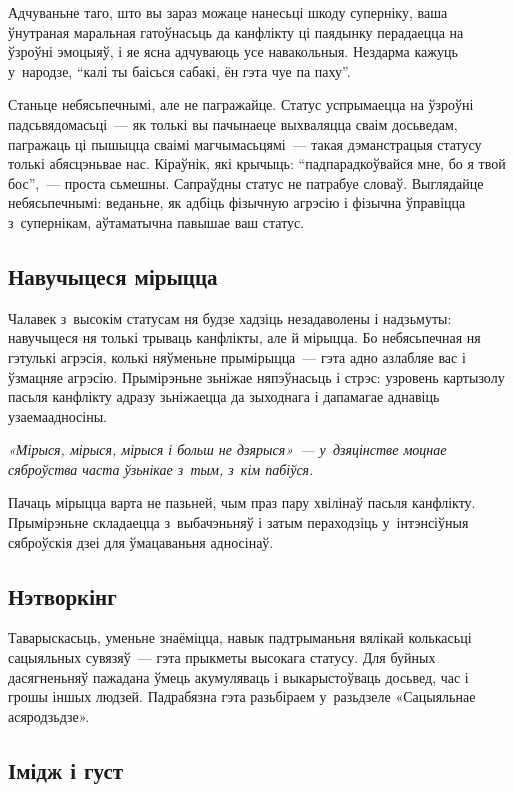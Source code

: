 Адчуваньне таго, што вы зараз можаце нанесьці шкоду суперніку, ваша ўнутраная маральная гатоўнасьць да канфлікту ці паядынку перадаецца на ўзроўні эмоцыяў, і яе ясна адчуваюць усе навакольныя. Нездарма кажуць у~народзе, ``калі ты баісься сабакі, ён гэта чуе па паху''.

Станьце небясьпечнымі, але не пагражайце. Статус успрымаецца на ўзроўні падсьвядомасьці~--- як толькі вы пачынаеце выхваляцца сваім досьведам, пагражаць ці пышыцца сваімі магчымасьцямі~--- такая дэманстрацыя статусу толькі абясцэньвае нас. Кіраўнік, які крычыць: ``падпарадкоўвайся мне, бо я твой бос'',~--- проста сьмешны. Сапраўдны статус не патрабуе словаў. Выглядайце небясьпечнымі: веданьне, як адбіць фізычную агрэсію і фізычна ўправіцца з~супернікам, аўтаматычна павышае ваш статус.

\subsection*{Навучыцеся мірыцца}

Чалавек з~высокім статусам ня будзе хадзіць незадаволены і надзьмуты: навучыцеся ня толькі трываць канфлікты, але й мірыцца. Бо небясьпечная ня гэтулькі агрэсія, колькі няўменьне прымірыцца~--- гэта адно азлабляе вас і ўзмацняе агрэсію. Прымірэньне зьніжае няпэўнасьць і стрэс: узровень картызолу пасьля канфлікту адразу зьніжаецца да зыходнага і дапамагае аднавіць узаемаадносіны.

\emph{«Мірыся, мірыся, мірыся і больш не дзярыся»~--- у~дзяцінстве моцнае сяброўства часта ўзьнікае з~тым, з~кім пабіўся.}

Пачаць мірыцца варта не пазьней, чым праз пару хвілінаў пасьля канфлікту. Прымірэньне складаецца з~выбачэньняў і затым пераходзіць у~інтэнсіўныя сяброўскія дзеі для ўмацаваньня адносінаў.

\subsection*{Нэтворкінг}

Таварыскасьць, уменьне знаёміцца, навык падтрыманьня вялікай колькасьці сацыяльных сувязяў~--- гэта прыкметы высокага статусу. Для буйных дасягненьняў пажадана ўмець акумуляваць і выкарыстоўваць досьвед, час і грошы іншых людзей. Падрабязна гэта разьбіраем у~разьдзеле «Сацыяльнае асяродзьдзе».

\subsection*{Імідж і густ}

